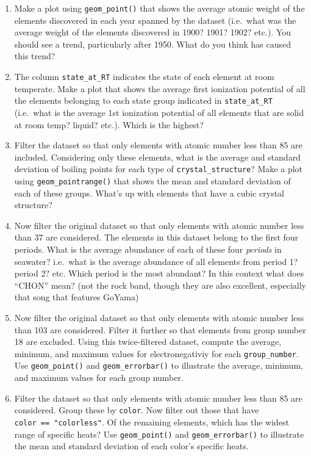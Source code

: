 \documentclass[
]{krantz}
\begin{document}
\begin{enumerate}
\def\labelenumi{\arabic{enumi}.}
\item
  Make a plot using \texttt{geom\_point()} that shows the average atomic weight of the elements discovered in each year spanned by the dataset (i.e.~what was the average weight of the elements discovered in 1900? 1901? 1902? etc.). You should see a trend, particularly after 1950. What do you think has caused this trend?
\item
  The column \texttt{state\_at\_RT} indicates the state of each element at room temperate. Make a plot that shows the average first ionization potential of all the elements belonging to each state group indicated in \texttt{state\_at\_RT} (i.e.~what is the average 1st ionization potential of all elements that are solid at room temp? liquid? etc.). Which is the highest?
\item
  Filter the dataset so that only elements with atomic number less than 85 are included. Considering only these elements, what is the average and standard deviation of boiling points for each type of \texttt{crystal\_structure}? Make a plot using \texttt{geom\_pointrange()} that shows the mean and standard deviation of each of these groups. What's up with elements that have a cubic crystal structure?
\item
  Now filter the original dataset so that only elements with atomic number less than 37 are considered. The elements in this dataset belong to the first four periods. What is the average abundance of each of these four \emph{periods} in seawater? i.e.~what is the average abundance of all elements from period 1? period 2? etc. Which period is the most abundant? In this context what does ``CHON'' mean? (not the rock band, though they are also excellent, especially that song that features GoYama)
\item
  Now filter the original dataset so that only elements with atomic number less than 103 are considered. Filter it further so that elements from group number 18 are excluded. Using this twice-filtered dataset, compute the average, minimum, and maximum values for electronegativiy for each \texttt{group\_number}. Use \texttt{geom\_point()} and \texttt{geom\_errorbar()} to illustrate the average, minimum, and maximum values for each group number.
\item
  Filter the dataset so that only elements with atomic number less than 85 are considered. Group these by \texttt{color}. Now filter out those that have \texttt{color\ ==\ "colorless"}. Of the remaining elements, which has the widest range of specific heats? Use \texttt{geom\_point()} and \texttt{geom\_errorbar()} to illustrate the mean and standard deviation of each color's specific heats.

\end{enumerate}
\end{document}
